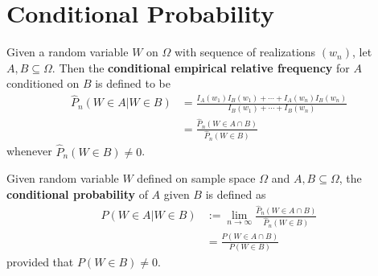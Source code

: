 \documentclass{article}
\begin{document}
   	\section{Conditional Probability}
   	\begin{definition}
   		Given a random variable $W$ on $\Omega$ with sequence of realizations $(w_n)$, let $A, B \subseteq \Omega$. Then the \textbf{conditional empirical relative frequency} for $A$ conditioned on $B$ is defined to be
   		\begin{align}
   			\hat{P}_{n}(W \in A | W \in B) &=\frac{I_{A}\left(w_{1}\right) I_{B}\left(w_{1}\right)+\cdots+I_{A}\left(w_{n}\right) I_{B}\left(w_{n}\right)}{I_{B}\left(w_{1}\right)+\cdots+I_{B}\left(w_{n}\right)} \\
   			&= \frac{\hat{P}_n(W \in A \cap B)}{\hat{P}_n(W \in B)}
   		\end{align}
   		whenever $\hat{P}_n(W \in B) \neq 0$.
   	\end{definition}
   	
   	\begin{definition}
   		Given random variable $W$ defined on sample space $\Omega$ and $A, B \subseteq \Omega$, the \textbf{conditional probability} of $A$ given $B$ is defined as
   		\begin{align}
   			P(W \in A | W \in B) &:= \lim_{n \to \infty} \frac{\hat{P}_n(W \in A \cap B)}{\hat{P}_n(W \in B)} \\
   			&= \frac{P(W \in A \cap B)}{P(W \in B)}
   		\end{align}
   		provided that $P(W \in B) \neq 0$.
   	\end{definition}
   	
\end{document}
